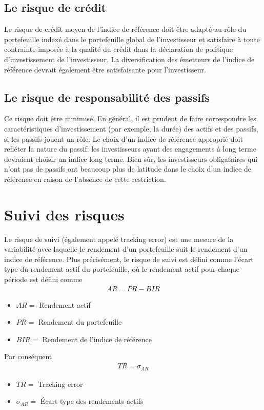 \documentclass[12pt]{article}
\begin{document}
\subsection{Le risque de crédit}
Le risque de crédit moyen de l’indice de référence doit être adapté au rôle du portefeuille indexé dans le portefeuille global de l’investisseur et satisfaire à toute contrainte imposée à la qualité du crédit dans la déclaration de politique d’investissement de l’investisseur. La diversification des émetteurs de l'indice de référence devrait également être satisfaisante pour l'investisseur.
\subsection{Le risque de responsabilité des passifs}
Ce risque doit être minimisé.  En général, il est prudent de faire correspondre les caractéristiques d'investissement (par exemple, la durée) des actifs et des passifs, si les passifs jouent un rôle. Le choix d'un indice de référence approprié doit refléter la nature du passif: les investisseurs ayant des engagements à long terme devraient choisir un indice long terme.  Bien sûr, les investisseurs obligataires qui n'ont pas de passifs ont beaucoup plus de latitude dans le choix d'un indice de référence en raison de l'absence de cette restriction.
\section{Suivi des risques}
Le risque de suivi (également appelé tracking error) est une mesure de la variabilité avec laquelle le rendement d'un portefeuille suit le rendement d'un indice de référence. Plus précisément, le risque de suivi est défini comme l'écart type du rendement actif du portefeuille, où le rendement actif pour chaque période est défini comme
\begin{align*}
AR = PR-BIR
\end{align*}
\begin{itemize}
\item $AR=$ Rendement actif 
\item $PR=$ Rendement du portefeuille 
\item $BIR=$ Rendement de l'indice de référence
\end{itemize}
Par conséquent
\begin{align*}
TR=\sigma_{AR}
\end{align*}
\begin{itemize}
\item $TR=$ Tracking error
\item $\sigma_{AR}=$ Écart type des rendements actifs
\end{itemize}
\end{document}
